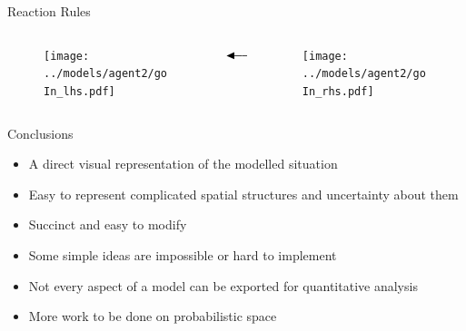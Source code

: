 \documentclass{beamer}
\newcommand\pro{\item[\textcolor{green}{$+$}]}
\newcommand\con{\item[\textcolor{red}{$-$}]}
\providecommand\longdoublearrowRHD{\mathrel\LHD\joinrel\relbar\joinrel\relbar\joinrel\mathrel\RHD}
\begin{document}
\begin{frame}{Reaction Rules}
  \begin{columns}
    \begin{column}{0.45\textwidth}
      \begin{figure}
        \centering
        \texttt{[image: ../models/agent2/goIn\_lhs.pdf]}
      \end{figure}
    \end{column}
    \begin{column}{0.1\textwidth}
      $\longdoublearrowRHD$
    \end{column}
    \begin{column}{0.45\textwidth}
      \begin{figure}
        \centering
        \texttt{[image: ../models/agent2/goIn\_rhs.pdf]}
      \end{figure}
    \end{column}
  \end{columns}
\end{frame}

\begin{frame}{Conclusions}
  \begin{itemize}
    \pro A direct visual representation of the modelled situation
    \pro Easy to represent complicated spatial structures and uncertainty about
    them
    \pro Succinct and easy to modify
    \con Some simple ideas are impossible or hard to implement
    \con Not every aspect of a model can be exported for quantitative analysis
    \item More work to be done on probabilistic space
  \end{itemize}
\end{frame}
\end{document}

